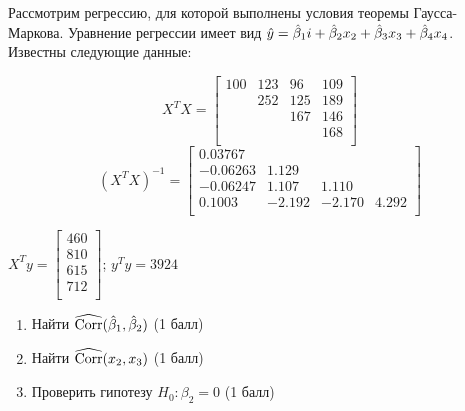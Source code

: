 \begin{problem}
Рассмотрим регрессию, для которой выполнены условия теоремы Гаусса-Маркова. Уравнение регрессии имеет вид $\hat{y} = \hat{\beta}_1 i + \hat{\beta}_2 x_2 + \hat{\beta}_3 x_3 + \hat{\beta}_4 x_4$. Известны следующие данные:

\[
X^T X = \begin{bmatrix}
100 & 123 & 96 & 109 \\
 & 252 & 125 & 189 \\
 & & 167 & 146 \\
 & & & 168 \\
\end{bmatrix}
\]
\[
(X^TX)^{-1} = \begin{bmatrix}
0.03767 & & & \\
-0.06263 & 1.129 & & \\
-0.06247 & 1.107 & 1.110 & \\
0.1003 & -2.192 & -2.170 & 4.292 \\
\end{bmatrix}
\] 

$X^Ty = \begin{bmatrix}
460\\
810\\
615\\
712\\
\end{bmatrix}$; $y^Ty = 3924$

\begin{enumerate}
\item Найти $\widehat{\operatorname{Corr}}(\hat{\beta}_1, \hat{\beta}_2)$ (1 балл)
\item Найти $\widehat{\operatorname{Corr}}(x_2, x_3)$ (1 балл)
\item Проверить гипотезу $H_0: \beta_2 = 0$ (1 балл)
\end{enumerate}
\end{problem}

